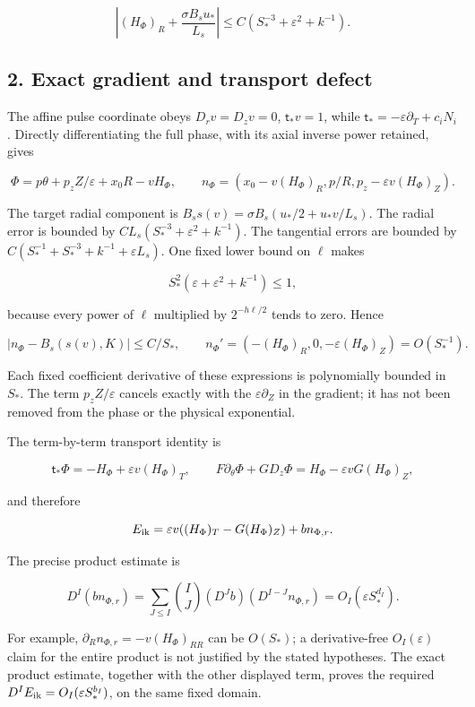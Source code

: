 \documentclass[10pt,a4paper]{article}
\begin{document}
\[
\left|(H_\Phi)_R+\frac{\sigma B_su_*}{L_s}\right|
\le C(S_*^{-3}+\varepsilon^2+k^{-1}).
\]

\subsection{2. Exact gradient and transport defect}\label{gclosure:exact-gradient-and-transport-defect}

The affine pulse coordinate obeys \(D_rv=D_zv=0\), \(\mathsf t_*v=1\), while \(\mathsf t_*=-\varepsilon\partial_T+c_iN_i\). Directly differentiating the full phase, with its axial inverse power retained, gives

\[
\Phi=p\theta+p_zZ/\varepsilon+x_0R-vH_\Phi,
\qquad
n_\Phi=(x_0-v(H_\Phi)_R,p/R,p_z-\varepsilon v(H_\Phi)_Z).
\]

The target radial component is \(B_ss(v)=\sigma B_s(u_*/2+u_*v/L_s)\). The radial error is bounded by \(CL_s(S_*^{-3}+\varepsilon^2+k^{-1})\). The tangential errors are bounded by \(C(S_*^{-1}+S_*^{-3}+k^{-1}+\varepsilon L_s)\). One fixed lower bound on \(\ell\) makes

\[
S_*^2(\varepsilon+\varepsilon^2+k^{-1})\le1,
\]

because every power of \(\ell\) multiplied by \(2^{-h\ell/2}\) tends to zero. Hence

\[
|n_\Phi-B_s(s(v),K)|\le C/S_*,\qquad
n_\Phi'=(-(H_\Phi)_R,0,-\varepsilon(H_\Phi)_Z)=O(S_*^{-1}).
\]

Each fixed coefficient derivative of these expressions is polynomially bounded in \(S_*\). The term \(p_zZ/\varepsilon\) cancels exactly with the \(\varepsilon\partial_Z\) in the gradient; it has not been removed from the phase or the physical exponential.

The term-by-term transport identity is

\[
\mathsf t_*\Phi=-H_\Phi+\varepsilon v(H_\Phi)_T,\qquad
F\partial_\theta\Phi+GD_z\Phi=H_\Phi-\varepsilon vG(H_\Phi)_Z,
\]

and therefore

\[
E_{\rm ik}=\varepsilon v((H_\Phi)_T-G(H_\Phi)_Z)+bn_{\Phi,r}.
\]

The precise product estimate is

\[
D^I(bn_{\Phi,r})=
\sum_{J\le I}\binom IJ(D^Jb)(D^{I-J}n_{\Phi,r})
=O_I(\varepsilon S_*^{d_I}).
\]

For example, \(\partial_Rn_{\Phi,r}=-v(H_\Phi)_{RR}\) can be \(O(S_*)\); a derivative-free \(O_I(\varepsilon)\) claim for the entire product is not justified by the stated hypotheses. The exact product estimate, together with the other displayed term, proves the required \(D^IE_{\rm ik}=O_I(\varepsilon S_*^{b_I})\), on the same fixed domain.
\end{document}
